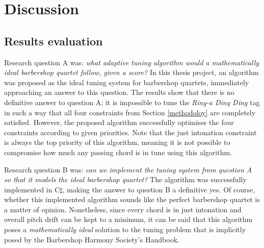 \documentclass[a4paper]{article}
\begin{document}
\section{Discussion}
\label{discussion}
\subsection{Results evaluation}

Research question A was: {\it what adaptive tuning algorithm would a mathematically ideal barbershop quartet follow, given a score?} In this thesis project, an algorithm was proposed as the ideal tuning system for barbershop quartets, immediately approaching an answer to this question. The results show that there is no definitive answer to question A; it is impossible to tune the \textit{Ring-a Ding Ding} tag in such a way that all four constraints from Section \ref{methodoloy} are completely satisfied. However, the proposed algorithm successfully optimises the four constraints according to given priorities. Note that the just intonation constraint is always the top priority of this algorithm, meaning it is not possible to compromise how much any passing chord is in tune using this algorithm.


Research question B was: {\it can we implement the tuning system from question A so that it models the ideal barbershop quartet?} The algorithm was successfully implemented in C$\sharp$, making the answer to question B a definitive yes. Of course, whether this implemented algorithm sounds like the perfect barbershop quartet is a matter of opinion. Nonetheless, since every chord is in just intonation and overall pitch drift can be kept to a minimum, it can be said that this algorithm poses a \textit{mathematically ideal} solution to the tuning problem that is implicitly posed by the Barbershop Harmony Society's Handbook. \cite{barbershop_harmony_society_contest_2022}
\end{document}
